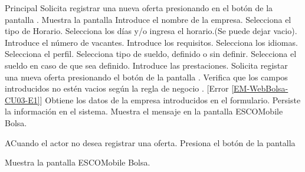 	\begin{UCtrayectoria}{Principal}
	\UCpaso[\UCactor] Solicita registrar una nueva oferta presionando en el botón  de la pantalla .
	\UCpaso Muestra la pantalla 
	\UCpaso [\UCactor] Introduce el nombre de la empresa.
	\UCpaso [\UCactor] Selecciona el tipo de Horario.
	\UCpaso [\UCactor] Selecciona los días y/o ingresa el horario.(Se puede dejar vacio).
	\UCpaso [\UCactor] Introduce el número de vacantes.
	\UCpaso [\UCactor] Introduce los requisitos.
	\UCpaso [\UCactor] Selecciona los idiomas.
	\UCpaso [\UCactor] Selecciona el perfil.
	\UCpaso [\UCactor] Selecciona tipo de sueldo, definido o sin definir.
	\UCpaso [\UCactor] Selecciona el sueldo en caso de que sea definido.
	\UCpaso [\UCactor] Introduce las prestaciones.
	\UCpaso [\UCactor] Solicita registar una nueva oferta presionando el botón  de la pantalla .  
	\UCpaso Verifica que los campos introducidos no estén vacios según la regla de negocio . [Error \ref{EM-WebBolsa-CU03-E1}] \label{Almacenainfo} 
	\UCpaso Obtiene los datos de la empresa introducidos en el formulario. 
	\UCpaso Persiste la información en el sistema.
	\UCpaso Muestra el mensaje  en la pantalla ESCOMobile Bolsa.  
	
	
	\end{UCtrayectoria}

\begin{UCtrayectoriaA}{A}{Cuando el actor no desea registrar una oferta.}
	\UCpaso [\UCactor] Presiona el botón  de la pantalla 

	\UCpaso Muestra la pantalla ESCOMobile Bolsa.  
\end{UCtrayectoriaA}
